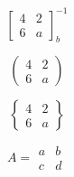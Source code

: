 \[
    \begin{bmatrix}

        4 & 2\\
        6 & a

    \end{bmatrix}^{-1}_b


\]

\[
    \begin{pmatrix}

        4 & 2\\
        6 & a

    \end{pmatrix}


\]

\[
    \begin{Bmatrix}

        4 & 2\\
        6 & a

    \end{Bmatrix}


\]



\[
    A=\begin{matrix}
    a & b\\
    c & d
    \end{matrix}
\]
